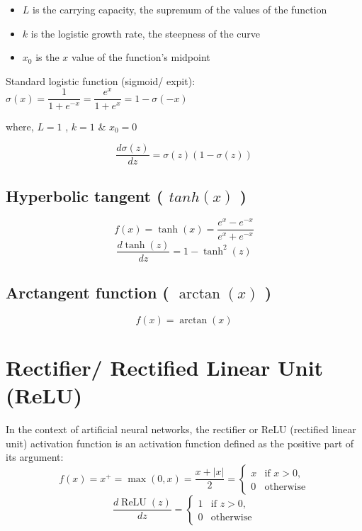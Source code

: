 \vspace{0.2cm}

\begin{itemize}
    \item $L$ is the carrying capacity, the supremum of the values of the function
    \item $k$ is the logistic growth rate, the steepness of the curve
    \item $x_{0}$ is the $x$ value of the function's midpoint
\end{itemize}

\vspace{0.2cm}
\noindent Standard logistic function (sigmoid/ expit):\label{sigmoid}
\(
\sigma(x) = {\displaystyle\dfrac{1}{1+e^{-x}}} = {\displaystyle\dfrac{e^{x}}{1+e^{x}}} = 1- \sigma(-x)
\)

where, $L=1$ , $k=1$ \& $x_{0}=0$


\[
    \displaystyle\dfrac{d\sigma(z)}{dz} = \sigma(z)(1 - \sigma(z))
\]


\subsection{Hyperbolic tangent ( $tanh(x)$ ) \cite{wiki-Sigmoid_function,wiki-Hyperbolic_functions}}\label{Hyperbolic tangent}

\[
    f(x)=\tanh(x)={\displaystyle\frac {e^{x}-e^{-x}}{e^{x}+e^{-x}}}
\]
\[
    \displaystyle\dfrac{d\tanh(z)}{dz} = 1-\tanh^2(z)
\]


\subsection{Arctangent function ( $\arctan(x)$ ) \cite{wiki-Inverse_trigonometric_functions}}
\[
    f(x)=\arctan(x)
\]


\section{Rectifier/ Rectified Linear Unit (ReLU) \cite{wiki-Rectifier}}\label{ReLU}
In the context of artificial neural networks, the rectifier or ReLU (rectified linear unit) activation function is an activation function defined as the positive part of its argument:
\[
    f(x)=x^{+}=\max(0,x)={\displaystyle\frac {x+|x|}{2}}={\begin{cases}x&{\text{if }}x>0,\\0&{\text{otherwise}}\end{cases}}
\]
\[
    \displaystyle\dfrac{d\operatorname{ReLU}(z)}{dz}={\begin{cases}1&{\text{if }}z>0,\\0&{\text{otherwise}}\end{cases}}
\]

